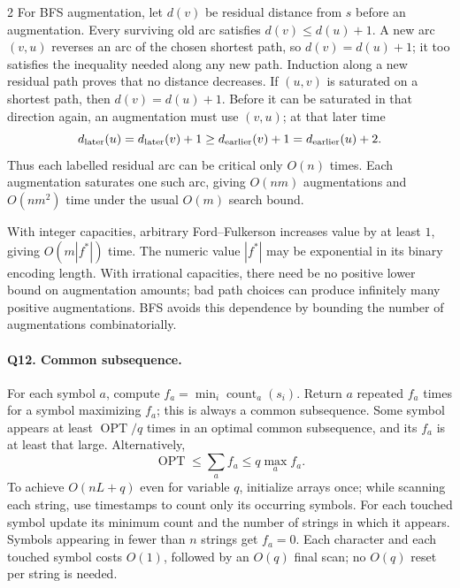 \documentclass[8pt]{extarticle}
\theoremstyle{definition}
\newcommand{\OPT}{\operatorname{OPT}}
\begin{document}
\begin{multicols*}{2}
For BFS augmentation, let $d(v)$ be residual distance from $s$ before an
augmentation.  Every surviving old arc satisfies $d(v)\le d(u)+1$.
A new arc $(v,u)$ reverses an arc of the chosen shortest path, so
$d(v)=d(u)+1$; it too satisfies the inequality needed along any new path.
Induction along a new residual path proves that no distance decreases.
If $(u,v)$ is saturated on a shortest path, then $d(v)=d(u)+1$.
Before it can be saturated in that direction again, an augmentation must
use $(v,u)$; at that later time
\[
d_{\rm later}(u)=d_{\rm later}(v)+1
\ge d_{\rm earlier}(v)+1=d_{\rm earlier}(u)+2.
\]
Thus each labelled residual arc can be critical only $O(n)$ times.
Each augmentation saturates one such arc, giving $O(nm)$ augmentations
and $O(nm^2)$ time under the usual $O(m)$ search bound.

With integer capacities, arbitrary Ford--Fulkerson increases value by at
least $1$, giving $O(m|f^*|)$ time.  The numeric value $|f^*|$ may be
exponential in its binary encoding length.  With irrational capacities,
there need be no positive lower bound on augmentation amounts; bad path
choices can produce infinitely many positive augmentations.  BFS avoids
this dependence by bounding the number of augmentations combinatorially.

\paragraph{Q12. Common subsequence.}
For each symbol $a$, compute $f_a=\min_i\operatorname{count}_a(s_i)$.
Return $a$ repeated $f_a$ times for a symbol maximizing $f_a$; this is
always a common subsequence.  Some symbol appears at least $\OPT/q$ times
in an optimal common subsequence, and its $f_a$ is at least that large.
Alternatively,
\[
\OPT\le\sum_a f_a\le q\max_a f_a.
\]
To achieve $O(nL+q)$ even for variable $q$, initialize arrays once; while
scanning each string, use timestamps to count only its occurring symbols.
For each touched symbol update its minimum count and the number of strings
in which it appears.  Symbols appearing in fewer than $n$ strings get
$f_a=0$.  Each character and each touched symbol costs $O(1)$, followed
by an $O(q)$ final scan; no $O(q)$ reset per string is needed.


\end{multicols*}
\end{document}
